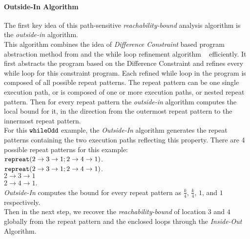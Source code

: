 \paragraph*{Outside-In Algorithm}
The first key idea of this path-sensitive \emph{reachability-bound} analysis algorithm is the \emph{outside-in} algorithm.
\\
This algorithm combines the idea of \emph{Difference Constraint} based program abstraction method from \cite{sinn2017complexity}
and the while loop refinement algorithm ~\cite{GulwaniJK09} efficiently.
It first abstracts the program based on the Difference Constraint and refines every while loop for this constraint program.
Each refined while loop in the program is composed of all possible repeat patterns.
The repeat pattern can be one single execution path,
or is composed of one or more execution paths, or nested repeat pattern.
Then for every repeat pattern
the \emph{outside-in} algorithm
computes the local bound for it,
in the direction
from the outermost repeat pattern to the innermost repeat pattern.
\\
For this ${\mathtt{whileOdd}}$ example, the \emph{Outside-In} algorithm generates 
the repeat patterns containing the two execution paths reflecting this property.
There are 4 possible repeat patterns for this example:
\\
${\mathtt{repreat}}(2 \to 3 \to 1; 2 \to 4 \to 1)$.
\\
${\mathtt{repreat}}(2 \to 3 \to 1; 2 \to 4 \to 1)$.
\\
$2 \to 3 \to 1$
\\
$2 \to 4 \to 1$.
\\
\emph{Outside-In} computes the bound for every repeat pattern
as $\frac{k}{4}$, $\frac{k}{4}$, $1$, and $1$ respectively.
\\
Then in the next step, we recover the \emph{reachability-bound} of location $3$ and $4$ globally from the
repeat pattern and the enclosed loops through the \emph{Inside-Out} Algorithm.
